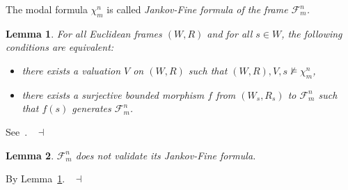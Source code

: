 \documentclass[draft]{article}
\newtheorem{lemma}{Lemma}
\newenvironment{proof}{{\bf Proof:}}{~$\dashv$\\}
\begin{document}
%
%
The modal formula $\chi_{m}^{n}$ is called {\it Jankov-Fine formula of the frame ${\mathcal F}_{m}^{n}$.}
%
%
\begin{lemma}\label{lemma:Jankov:Fine:ONE}
%
%
For all Euclidean frames $(W,R)$ and for all $s{\in}W$, the following conditions are equivalent:
%
%
\begin{itemize}
%
%
\item there exists a valuation $V$ on $(W,R)$ such that $(W,R),V,s{\not\models}\chi_{m}^{n}$,
%
%
\item there exists a surjective bounded morphism $f$ from $(W_{s},R_{s})$ to ${\mathcal F}_{m}^{n}$ such that $f(s)$ generates ${\mathcal F}_{m}^{n}$.
%
%
\end{itemize}
%
%
\end{lemma}
%
%
\begin{proof}
%
%
See~\cite[Chapter~$3$]{Blackburn:deRijke:Venema:2001}.
%
%
\medskip
%
%
\end{proof}
%
%
\begin{lemma}\label{lemma:Jankov:Fine:TWO}
%
%
${\mathcal F}_{m}^{n}$ does not validate its Jankov-Fine formula.
%
%
\end{lemma}
%
%
\begin{proof}
%
%
By Lemma~\ref{lemma:Jankov:Fine:ONE}.
%
%
\medskip
%
%
\end{proof}
%
%
%
%
\end{document}
